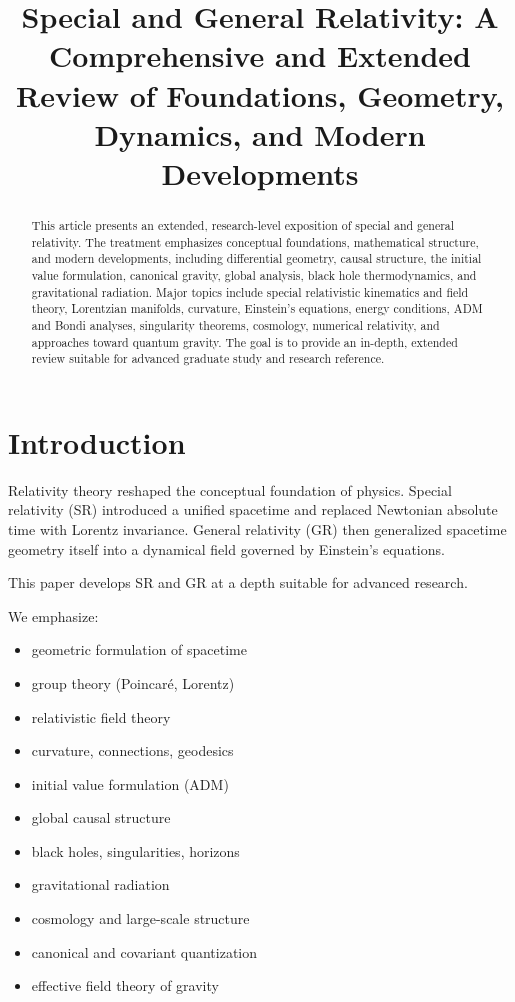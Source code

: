 \documentclass[12pt]{article}
\title{\textbf{Special and General Relativity: A Comprehensive and Extended Review of 
Foundations, Geometry, Dynamics, and Modern Developments}}
\author{}
\date{}
\begin{document}
\maketitle

\begin{abstract}
This article presents an extended, research-level exposition of special 
and general relativity. The treatment emphasizes conceptual foundations, 
mathematical structure, and modern developments, including differential 
geometry, causal structure, the initial value formulation, canonical 
gravity, global analysis, black hole thermodynamics, and gravitational 
radiation. Major topics include special relativistic kinematics and 
field theory, Lorentzian manifolds, curvature, Einstein's equations, 
energy conditions, ADM and Bondi analyses, singularity theorems, 
cosmology, numerical relativity, and approaches toward quantum gravity. 
The goal is to provide an in-depth, extended review suitable for advanced 
graduate study and research reference.
\end{abstract}

\tableofcontents

\section{Introduction}

Relativity theory reshaped the conceptual foundation of physics. 
Special relativity (SR) introduced a unified spacetime and replaced 
Newtonian absolute time with Lorentz invariance. General relativity (GR) 
then generalized spacetime geometry itself into a dynamical field 
governed by Einstein's equations.

This paper develops SR and GR at a depth suitable for advanced research.

We emphasize:

\begin{itemize}
\item geometric formulation of spacetime
\item group theory (Poincaré, Lorentz)
\item relativistic field theory
\item curvature, connections, geodesics
\item initial value formulation (ADM)
\item global causal structure
\item black holes, singularities, horizons
\item gravitational radiation
\item cosmology and large-scale structure
\item canonical and covariant quantization
\item effective field theory of gravity
\end{itemize}
\end{document}
